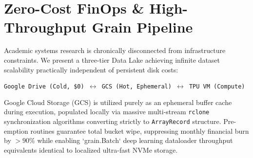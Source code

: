 \documentclass[11pt]{article}
\begin{document}
\section{Zero-Cost FinOps \& High-Throughput Grain Pipeline}
Academic systems research is chronically disconnected from infrastructure constraints. We present a three-tier Data Lake achieving infinite dataset scalability practically independent of persistent disk costs:
\begin{center}
\texttt{Google Drive (Cold, \$0) $\leftrightarrow$ GCS (Hot, Ephemeral) $\leftrightarrow$ TPU VM (Compute)}
\end{center}
Google Cloud Storage (GCS) is utilized purely as an ephemeral buffer cache during execution, populated locally via massive multi-stream \texttt{rclone} synchronization algorithms converting strictly to \texttt{ArrayRecord} structure. Pre-emption routines guarantee total bucket wipe, suppressing monthly financial burn by $>90\%$ while enabling `grain.Batch` deep learning dataloader throughput equivalents identical to localized ultra-fast NVMe storage.
\end{document}
